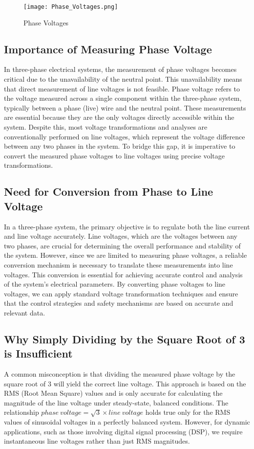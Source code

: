 \begin{figure}[h]
    \centering
    \texttt{[image: Phase\_Voltages.png]}
    \caption{Phase Voltages}
    \label{fig:Phase Voltages}
\end{figure}

\subsection{Importance of Measuring Phase Voltage}
In three-phase electrical systems, the measurement of phase voltages becomes
critical due to the unavailability of the neutral point. This unavailability
means that direct measurement of line voltages is not feasible. Phase voltage
refers to the voltage measured across a single component within the three-phase
system, typically between a phase (live) wire and the neutral point. These
measurements are essential because they are the only voltages directly
accessible within the system. Despite this, most voltage transformations and
analyses are conventionally performed on line voltages, which represent the
voltage difference between any two phases in the system. To bridge this gap, it
is imperative to convert the measured phase voltages to line voltages using
precise voltage transformations.

\subsection{Need for Conversion from Phase to Line Voltage}
In a three-phase system, the primary objective is to regulate both the line
current and line voltage accurately. Line voltages, which are the voltages
between any two phases, are crucial for determining the overall performance and
stability of the system. However, since we are limited to measuring phase
voltages, a reliable conversion mechanism is necessary to translate these
measurements into line voltages. This conversion is essential for achieving
accurate control and analysis of the system's electrical parameters. By
converting phase voltages to line voltages, we can apply standard voltage
transformation techniques and ensure that the control strategies and safety
mechanisms are based on accurate and relevant data.

\subsection{Why Simply Dividing by the Square Root of 3 is Insufficient}
A common misconception is that dividing the measured phase voltage by the
square root of 3 will yield the correct line voltage. This approach is based on
the RMS (Root Mean Square) values and is only accurate for calculating the
magnitude of the line voltage under steady-state, balanced conditions. The
relationship \(phase\ voltage = \sqrt{3} \times line\ voltage\) holds true only
for the RMS values of sinusoidal voltages in a perfectly balanced system.
However, for dynamic applications, such as those involving digital signal
processing (DSP), we require instantaneous line voltages rather than just RMS
magnitudes.

